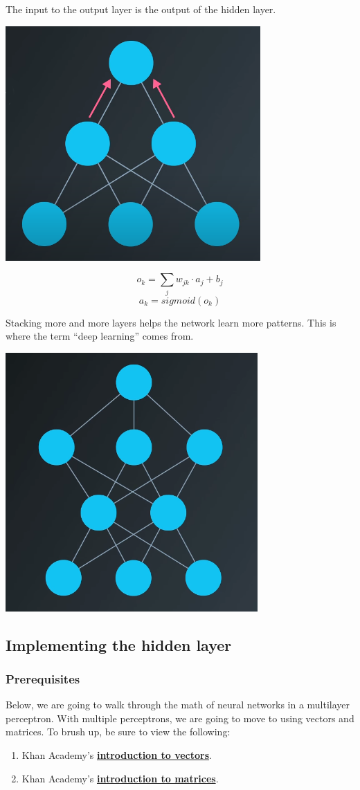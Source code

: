 The input to the output layer is the output of the hidden layer.

\includegraphics[width=0.5\linewidth]{img//intro//multilayer-perceptrons-4.png}

\[o_k = \sum_j w_{jk} \cdot a_j + b_j\]
\[a_k = sigmoid(o_k)\]

Stacking more and more layers helps the network learn more patterns. This is where the term “deep learning” comes from.

\includegraphics[width=0.5\linewidth]{img//intro//multilayer-perceptrons-5.png}

\subsection{Implementing the hidden layer}

\subsubsection{Prerequisites}
Below, we are going to walk through the math of neural networks in a multilayer perceptron. With multiple perceptrons, we are going to move to using vectors and matrices. To brush up, be sure to view the following:

\begin{enumerate}
    \item Khan Academy's \href{https://www.khanacademy.org/math/linear-algebra/vectors-and-spaces/vectors/v/vector-introduction-linear-algebra}{\textbf{introduction to vectors}}.
    \item Khan Academy's \href{https://www.khanacademy.org/math/precalculus/x9e81a4f98389efdf:matrices}{\textbf{introduction to matrices}}.
\end{enumerate}

